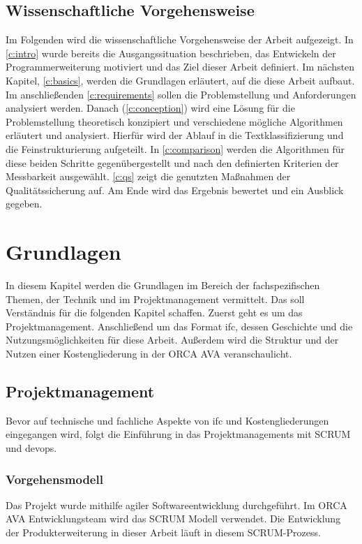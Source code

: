 \section{Wissenschaftliche Vorgehensweise}
\label{c:intro:methodology:scientific_proceture}
Im Folgenden wird die wissenschaftliche Vorgehensweise der Arbeit aufgezeigt.
In \autoref{c:intro} wurde bereits die Ausgangssituation beschrieben, das Entwickeln der Programmerweiterung motiviert und das Ziel dieser Arbeit definiert. Im nächsten Kapitel, \autoref{c:basics}, werden die Grundlagen erläutert, auf die diese Arbeit aufbaut. Im anschließenden \autoref{c:requirements} sollen die Problemstellung und Anforderungen analysiert werden. Danach (\autoref{c:conception}) wird eine Lösung für die Problemstellung theoretisch konzipiert und verschiedene mögliche Algorithmen erläutert und analysiert. Hierfür wird der Ablauf in die Textklassifizierung und die Feinstrukturierung aufgeteilt. In \autoref{c:comparison} werden die Algorithmen für diese beiden Schritte gegenübergestellt und nach den definierten Kriterien der Messbarkeit ausgewählt. \autoref{c:qs} zeigt die genutzten Maßnahmen der Qualitätssicherung auf. Am Ende wird das Ergebnis bewertet und ein Ausblick gegeben.


\chapter{Grundlagen}
\label{c:basics}
In diesem Kapitel werden die Grundlagen im Bereich der fachspezifischen Themen, der Technik und im Projektmanagement vermittelt. Das soll Verständnis für die folgenden Kapitel schaffen. Zuerst geht es um das Projektmanagement. Anschließend um das Format \ac{ifc}, dessen Geschichte und die Nutzungsmöglichkeiten für diese Arbeit. Außerdem wird die Struktur und der Nutzen einer Kostengliederung in der ORCA AVA veranschaulicht.

\section{Projektmanagement}
\label{c:basics:project-management}
Bevor auf technische und fachliche Aspekte von \ac{ifc} und Kostengliederungen eingegangen wird, folgt die Einführung in das Projektmanagements mit SCRUM und \ac{devops}.

\subsection{Vorgehensmodell}
\label{c:basics:project-management:procedure_model}
Das Projekt wurde mithilfe agiler Softwareentwicklung durchgeführt. Im ORCA AVA Entwicklungsteam wird das SCRUM Modell verwendet. Die Entwicklung der Produkterweiterung in dieser Arbeit läuft in diesem SCRUM-Prozess.

